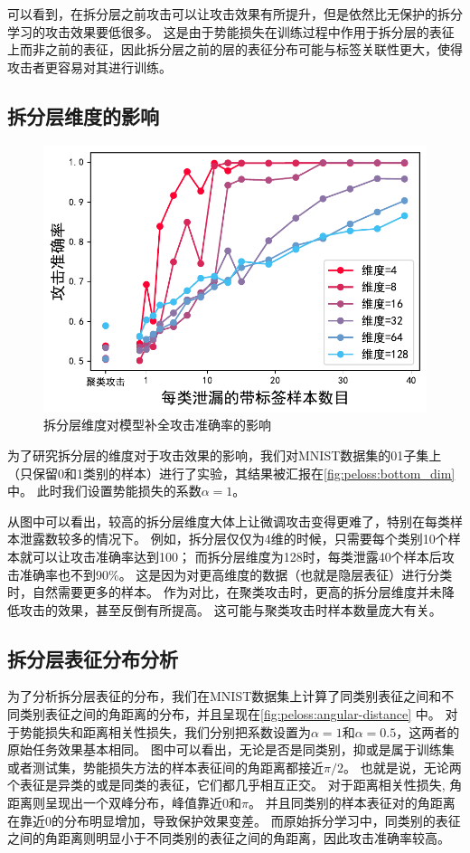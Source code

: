 可以看到，在拆分层之前攻击可以让攻击效果有所提升，但是依然比无保护的拆分学习的攻击效果要低很多。
%
这是由于势能损失在训练过程中作用于拆分层的表征上而非之前的表征，因此拆分层之前的层的表征分布可能与标签关联性更大，使得攻击者更容易对其进行训练。

\subsection{拆分层维度的影响}
\begin{figure}[h!]
    \centering
    \includegraphics[width=0.7\linewidth]{Z_Resources/peloss_mnist-subclass2}
    \caption{拆分层维度对模型补全攻击准确率的影响}
    \label{fig:peloss:bottom_dim}
\end{figure}

为了研究拆分层的维度对于攻击效果的影响，我们对MNIST数据集的01子集上（只保留0和1类别的样本）进行了实验，其结果被汇报在\autoref{fig:peloss:bottom_dim}中。
此时我们设置势能损失的系数$\alpha=1$。

从图中可以看出，较高的拆分层维度大体上让微调攻击变得更难了，特别在每类样本泄露数较多的情况下。
%
例如，拆分层仅仅为4维的时候，只需要每个类别10个样本就可以让攻击准确率达到100；
而拆分层维度为128时，每类泄露40个样本后攻击准确率也不到90\%。
这是因为对更高维度的数据（也就是隐层表征）进行分类时，自然需要更多的样本。
%
作为对比，在聚类攻击时，更高的拆分层维度并未降低攻击的效果，甚至反倒有所提高。
这可能与聚类攻击时样本数量庞大有关。



\subsection{拆分层表征分布分析}
%
为了分析拆分层表征的分布，我们在MNIST数据集上计算了同类别表征之间和不同类别表征之间的角距离的分布，并且呈现在\autoref{fig:peloss:angular-distance} 中。
%
对于势能损失和距离相关性损失，我们分别把系数设置为$\alpha=1$和$\alpha=0.5$，这两者的原始任务效果基本相同。
%
图中可以看出，无论是否是同类别，抑或是属于训练集或者测试集，势能损失方法的样本表征间的角距离都接近$\pi/2$。
也就是说，无论两个表征是异类的或是同类的表征，它们都几乎相互正交。
%
对于距离相关性损失, 角距离则呈现出一个双峰分布，峰值靠近$0$和$\pi$。
并且同类别的样本表征对的角距离在靠近0的分布明显增加，导致保护效果变差。
%
而原始拆分学习中，同类别的表征之间的角距离则明显小于不同类别的表征之间的角距离，因此攻击准确率较高。


